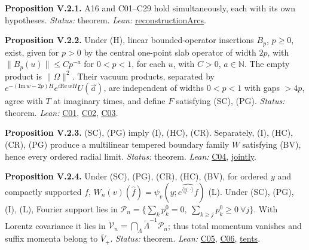 \documentclass[
  letterpaper,
  11pt]{article}
\begin{document}
\textbf{Proposition V.2.1.} A16 and C01--C29 hold simultaneously, each
with its own hypotheses. \emph{Status:} theorem. \emph{Lean:}
\href{https://github.com/yang-mills-group/OpenAI-YM-20261028/blob/3456e5e75cf8d4cd558955a5c7638fba2d68f464/YM/Integrated.lean\#L182-L212}{reconstructionArcs}.

\textbf{Proposition V.2.2.} Under (H), linear bounded-operator
insertions \(B_p\), \(p\ge0\), exist, given for \(p>0\) by the central
one-point slab operator of width \(2p\), with \(\|B_p(u)\|\le Cp^{-a}\)
for \(0<p<1\), for each \(u\), with \(C>0\), \(a\in\mathbb N\). The
empty product is \(\|\Omega\|^2\). Their vacuum products, separated by
\(e^{-(\mathrm{Im}\,w-2p)H}e^{i\mathrm{Re}\,wH}U(\vec a)\), are
independent of widths \(0<p<1\) with gaps \(>4p\), agree with \(T\) at
imaginary times, and define \(F\) satisfying (SC), (PG). \emph{Status:}
theorem. \emph{Lean:}
\href{https://github.com/yang-mills-group/OpenAI-YM-20261028/blob/3456e5e75cf8d4cd558955a5c7638fba2d68f464/YM/Work/C01.lean\#L99-L117}{C01},
\href{https://github.com/yang-mills-group/OpenAI-YM-20261028/blob/3456e5e75cf8d4cd558955a5c7638fba2d68f464/YM/Work/C02.lean\#L168-L177}{C02},
\href{https://github.com/yang-mills-group/OpenAI-YM-20261028/blob/3456e5e75cf8d4cd558955a5c7638fba2d68f464/YM/Work/C03.lean\#L245-L248}{C03}.

\textbf{Proposition V.2.3.} (SC), (PG) imply (I), (HC), (CR).
Separately, (I), (HC), (CR), (PG) produce a multilinear tempered
boundary family \(W\) satisfying (BV), hence every ordered radial limit.
\emph{Status:} theorem. \emph{Lean:}
\href{https://github.com/yang-mills-group/OpenAI-YM-20261028/blob/3456e5e75cf8d4cd558955a5c7638fba2d68f464/YM/Work/C04.lean\#L221-L222}{C04},
\href{https://github.com/yang-mills-group/OpenAI-YM-20261028/blob/3456e5e75cf8d4cd558955a5c7638fba2d68f464/YM/Shift/Osc.lean\#L83-L86}{jointly}.

\textbf{Proposition V.2.4.} Under (SC), (PG), (CR), (HC), (BV), for
ordered \(y\) and compactly supported \(f\),
\(W_n(v)(\hat f)=\psi_v(y;\widehat{e^{\langle\underline y,\cdot\rangle}f})\)
(L). Under (SC), (PG), (I), (L), Fourier support lies in
\(\mathcal P_n=\{\sum_kp_k^0=0,\ \sum_{k\ge j}p_k^0\ge0\ \forall j\}\).
With Lorentz covariance it lies in
\(\mathcal V_n=\bigcap_\Lambda\tilde\Lambda^{-1}\mathcal P_n\); thus
total momentum vanishes and suffix momenta belong to \(\bar V_+\).
\emph{Status:} theorem. \emph{Lean:}
\href{https://github.com/yang-mills-group/OpenAI-YM-20261028/blob/3456e5e75cf8d4cd558955a5c7638fba2d68f464/YM/Work/C05.lean\#L205-L230}{C05},
\href{https://github.com/yang-mills-group/OpenAI-YM-20261028/blob/3456e5e75cf8d4cd558955a5c7638fba2d68f464/YM/Work/C06.lean\#L136-L157}{C06},
\href{https://github.com/yang-mills-group/OpenAI-YM-20261028/blob/3456e5e75cf8d4cd558955a5c7638fba2d68f464/YM/Shift/Closing.lean\#L106-L121}{tents}.
\end{document}
